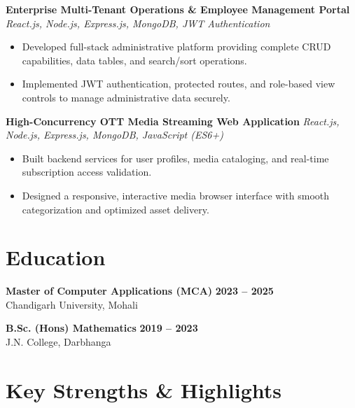 \documentclass[a4paper,10pt]{article}
\begin{document}
\textbf{Enterprise Multi-Tenant Operations \& Employee Management Portal}
\hfill
\textit{React.js, Node.js, Express.js, MongoDB, JWT Authentication}

\begin{itemize}

    \item Developed full-stack administrative platform providing complete CRUD capabilities, data tables, and search/sort operations.

    \item Implemented JWT authentication, protected routes, and role-based view controls to manage administrative data securely.

\end{itemize}


\textbf{High-Concurrency OTT Media Streaming Web Application}
\hfill
\textit{React.js, Node.js, Express.js, MongoDB, JavaScript (ES6+)}

\begin{itemize}

    \item Built backend services for user profiles, media cataloging, and real-time subscription access validation.

    \item Designed a responsive, interactive media browser interface with smooth categorization and optimized asset delivery.

\end{itemize}

\section*{Education}

\textbf{Master of Computer Applications (MCA)}
\hfill
\textbf{2023 -- 2025}
\\
Chandigarh University, Mohali

\vspace{3pt}

\textbf{B.Sc. (Hons) Mathematics}
\hfill
\textbf{2019 -- 2023}
\\
J.N. College, Darbhanga

\section*{Key Strengths \& Highlights}
\end{document}
